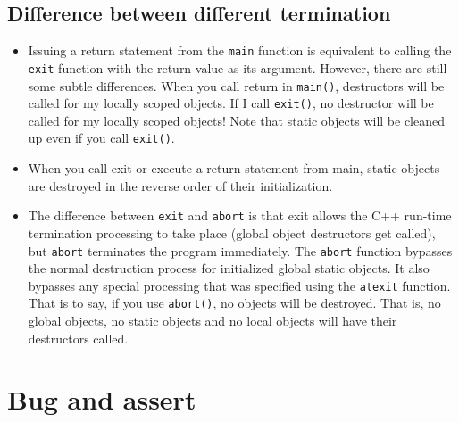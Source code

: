 \documentclass[a4paper,11pt,twoside]{book}
\begin{document}
\subsection{Difference between different termination}
\begin{itemize}
	\item Issuing a return statement from the \texttt{main} function is equivalent to calling the \texttt{exit} function with the return value as its argument. However, there are still some subtle differences. When you call return in \texttt{main()}, destructors will be called for my locally scoped objects. If I call \texttt{exit()}, no destructor will be called for my locally scoped objects! Note that static objects will be cleaned up even if you call \texttt{exit()}. 
	
    \item When you call exit or execute a return statement from main, static objects are destroyed in the reverse order of their initialization.
	
	\item The difference between \texttt{exit} and \texttt{abort} is that exit allows the C++ run-time termination processing to take place (global object destructors get called), but \texttt{abort} terminates the program immediately. The \texttt{abort} function bypasses the normal destruction process for initialized global static objects. It also bypasses any special processing that was specified using the \texttt{atexit} function. That is to say, if you use \texttt{abort()}, no objects will be destroyed. That is, no global objects, no static objects and no local objects will have their destructors called.
	
\end{itemize}


\section{Bug and assert}
\end{document}
